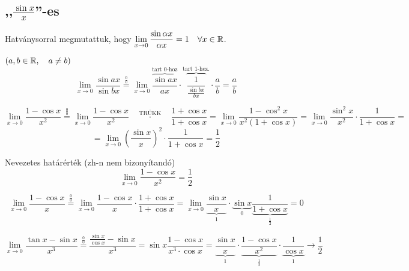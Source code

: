 \documentclass[a4paper,11.5pt]{article}
\begin{document}
	\subsection{,,$\displaystyle \frac{\sin x}{x}$''-es}
	\begin{note}
		Hatványsorral megmutattuk, hogy $\displaystyle \lim_{x\to0}\frac{\sin \alpha x}{\alpha x} = 1\quad \forall x\in\mathbb{R}$.
	\end{note}
	\begin{task}$(a,b\in\mathbb{R}, \quad a\not=b)$
		\[ \lim_{x\to0}\frac{\sin ax}{\sin bx}\overset{\frac{0}{0}}{=} \lim_{x\to0}\overbrace{\frac{\sin ax}{ax}}^{\text{tart 0-hoz}}\cdot\overbrace{\frac{1}{\frac{\sin bx}{bx}}}^{\text{tart 1-hez.}}\cdot\frac{a}{b}=\frac{a}{b} \]
	\end{task}
	\begin{task}
		\[ \lim_{x\to0}\frac{1-\cos x}{x^2}\overset{\frac{0}{0}}{=}\lim_{x\to0}\frac{1-\cos x}{x^2}\quad \overset{\text{TRÜKK}}{\cdot}\quad \frac{1+\cos x}{1+\cos x}=\lim_{x\to0}\frac{1-\cos^2x}{x^2(1+\cos x)}=\lim_{x\to 0}\frac{\sin^2x}{x^2}\cdot\frac{1}{1+\cos x}=\]\[=\lim_{x\to0}\left(\frac{\sin x}{x}\right)^2\cdot\frac{1}{1+\cos x}=\frac{1}{2} \]
	\end{task}
	\begin{note}Nevezetes határérték (zh-n nem bizonyítandó)
		\[ \lim_{x\to0}\frac{1-\cos x}{x^2}=\frac{1}{2} \]
	\end{note}
	\begin{task}
		\[ \lim_{x\to0}\frac{1-\cos x}{x}\overset{\frac{0}{0}}{=}\lim_{x\to0}\frac{1-\cos x}{x}\cdot\frac{1+\cos x}{1+\cos x}=\lim_{x\to0}\underbrace{\frac{\sin x}{x}}_{1}\cdot\underbrace{\sin x}_{0}\underbrace{\frac{1}{1+\cos x}}_{\frac{1}{2}}=0 \]
	\end{task}
	\begin{task}
		\[ \lim_{x\to0}\frac{\tan x-\sin x}{x^3}\overset{\frac{0}{0}}{=}\frac{\frac{\sin x}{\cos x}-\sin x}{x^3}=\sin x\frac{1-\cos x}{x^3\cdot \cos x}=\underbrace{\frac{\sin x}{x}}_1\cdot\underbrace{\frac{1-\cos x}{x^2}}_{\frac{1}{2}}\cdot\underbrace{\frac{1}{\cos x}}_1\rightarrow\frac{1}{2} \]
	\end{task}
\end{document}
